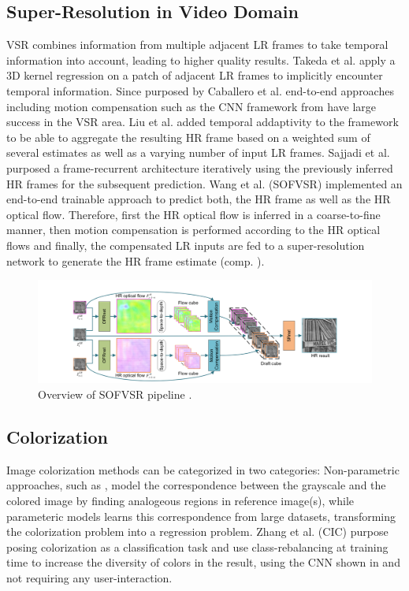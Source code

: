 \subsection{Super-Resolution in Video Domain}
\ac{VSR} combines information from multiple adjacent LR frames
to take temporal information into account, leading to higher quality results.
Takeda et al. \cite{SRWESME} apply a 3D kernel regression on a patch of adjacent
\ac{LR} frames to implicitly encounter temporal information. Since purposed by
Caballero et al. \cite{RTVSRWSTNAMC} end-to-end approaches including motion
compensation such as the CNN framework from \cite{RTVSRWSTNAMC} have large success
in the VSR area. Liu et al. \cite{RVSRWLTD} added temporal addaptivity to the
framework to be able to aggregate the resulting \ac{HR} frame based on a weighted
sum of several estimates as well as a varying number of input LR frames. Sajjadi
et al. \cite{FRVSR} purposed a frame-recurrent architecture iteratively using
the previously inferred \ac{HR} frames for the subsequent prediction. Wang et al.
\cite{LFVSRTHROFE} (SOFVSR) implemented an end-to-end trainable approach to predict
both, the \ac{HR} frame as well as the HR optical flow. Therefore, first the HR
optical flow is inferred in a coarse-to-fine manner, then motion compensation is
performed according to the HR optical flows and finally, the compensated LR
inputs are fed to a super-resolution network to generate the HR frame estimate
(comp. ).

\begin{figure}[!htbp]
	\centering
	\includegraphics[width=14cm]{figures/sofvsr}
	\caption{Overview of SOFVSR pipeline \cite{LFVSRTHROFE}.}
  \label{fig:sofvsr}
\end{figure}

\subsection{Colorization}
Image colorization methods can be categorized in two categories: Non-parametric
approaches, such as \cite{ICUSI}, model the correspondence between the grayscale
and the colored image by finding analogeous regions in reference image(s),
while parameteric models learns this correspondence from large datasets,
transforming the colorization problem into a regression problem. Zhang et al.
\cite{CIC} (CIC) purpose posing colorization as a classification task and use
class-rebalancing at training time to increase the diversity of colors in the
result, using the CNN shown in  and not requiring any
user-interaction.

